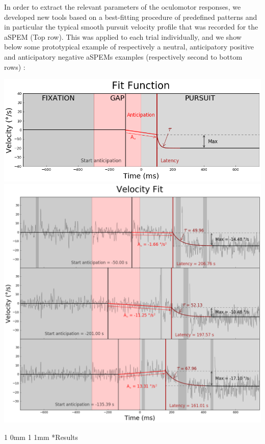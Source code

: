 \documentclass[profile,final,english, draft]{sciposter}%
\makeatletter
\renewcommand{\section}{\@startsection
        {section}%
        {1}%
        {0mm}%
        {1\baselineskip}%
        {1mm}%
        {\large\color{red}\bfseries}}%
\makeatother
\begin{document}
\begin{multicols}{3}
In order to extract the relevant parameters of the oculomotor responses, we developed new tools based on a best-fitting procedure of predefined patterns and in particular the typical smooth pursuit velocity profile that was recorded for the aSPEM (Top row). This was applied to each trial individually, and we show below some prototypical example of respectively a neutral, anticipatory positive and anticipatory negative aSPEMs examples (respectively second to bottom rows) :

\begin{center} 
    \includegraphics[width=1\columnwidth]{Fonction_Fit}
    \includegraphics[width=1\columnwidth]{Fit_vitesse}
\end{center}

\section*{Results}


\end{multicols}
\end{document}
